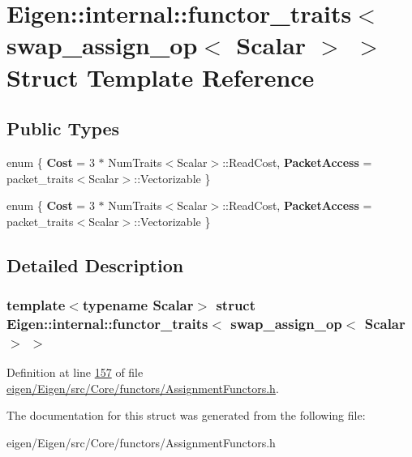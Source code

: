 \hypertarget{struct_eigen_1_1internal_1_1functor__traits_3_01swap__assign__op_3_01_scalar_01_4_01_4}{}\section{Eigen\+:\+:internal\+:\+:functor\+\_\+traits$<$ swap\+\_\+assign\+\_\+op$<$ Scalar $>$ $>$ Struct Template Reference}
\label{struct_eigen_1_1internal_1_1functor__traits_3_01swap__assign__op_3_01_scalar_01_4_01_4}
\subsection*{Public Types}
\begin{DoxyCompactItemize}
\item 
\mbox{\label{struct_eigen_1_1internal_1_1functor__traits_3_01swap__assign__op_3_01_scalar_01_4_01_4_a63eb21c7bfa73f4f2052001318be0c1c}} 
enum \{ {\bfseries Cost} = 3 $\ast$ Num\+Traits$<$Scalar$>$\+:\+:Read\+Cost, 
{\bfseries Packet\+Access} = packet\+\_\+traits$<$Scalar$>$\+:\+:Vectorizable
 \}
\item 
\mbox{\label{struct_eigen_1_1internal_1_1functor__traits_3_01swap__assign__op_3_01_scalar_01_4_01_4_a2d7de693f16f0d81cca3455e31c45a29}} 
enum \{ {\bfseries Cost} = 3 $\ast$ Num\+Traits$<$Scalar$>$\+:\+:Read\+Cost, 
{\bfseries Packet\+Access} = packet\+\_\+traits$<$Scalar$>$\+:\+:Vectorizable
 \}
\end{DoxyCompactItemize}


\subsection{Detailed Description}
\subsubsection*{template$<$typename Scalar$>$\newline
struct Eigen\+::internal\+::functor\+\_\+traits$<$ swap\+\_\+assign\+\_\+op$<$ Scalar $>$ $>$}



Definition at line \hyperlink{eigen_2_eigen_2src_2_core_2functors_2_assignment_functors_8h_source_l00157}{157} of file \hyperlink{eigen_2_eigen_2src_2_core_2functors_2_assignment_functors_8h_source}{eigen/\+Eigen/src/\+Core/functors/\+Assignment\+Functors.\+h}.



The documentation for this struct was generated from the following file\+:\begin{DoxyCompactItemize}
\item 
eigen/\+Eigen/src/\+Core/functors/\+Assignment\+Functors.\+h\end{DoxyCompactItemize}
